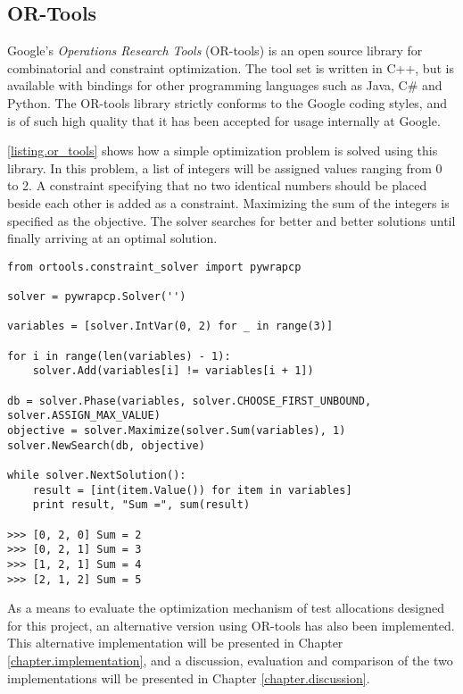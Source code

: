 \subsection{OR-Tools}\label{subsection.ortools}
Google's \emph{Operations Research Tools} (OR-tools) \cite{ortools} is an open source library for combinatorial and constraint optimization. The tool set is written in C++, but is available with bindings for other programming languages such as Java, C\# and Python. The OR-tools library strictly conforms to the Google coding styles, and is of such high quality that it has been accepted for usage internally at Google.

\lstlistingname \space \ref{listing.or_tools} shows how a simple optimization problem is solved using this library. In this problem, a list of integers will be assigned values ranging from 0 to 2. A constraint specifying that no two identical numbers should be placed beside each other is added as a constraint. Maximizing the sum of the integers is specified as the objective. The solver searches for better and better solutions until finally arriving at an optimal solution.

\vspace{4mm}
\begin{lstlisting}[caption=OR-Tool Implementation, label={listing.or_tools}]
from ortools.constraint_solver import pywrapcp

solver = pywrapcp.Solver('')

variables = [solver.IntVar(0, 2) for _ in range(3)]

for i in range(len(variables) - 1):
    solver.Add(variables[i] != variables[i + 1])

db = solver.Phase(variables, solver.CHOOSE_FIRST_UNBOUND, solver.ASSIGN_MAX_VALUE)
objective = solver.Maximize(solver.Sum(variables), 1)
solver.NewSearch(db, objective)

while solver.NextSolution():
    result = [int(item.Value()) for item in variables]
    print result, "Sum =", sum(result)

>>> [0, 2, 0] Sum = 2
>>> [0, 2, 1] Sum = 3
>>> [1, 2, 1] Sum = 4
>>> [2, 1, 2] Sum = 5
\end{lstlisting}

As a means to evaluate the optimization mechanism of test allocations designed for this project, an alternative version using OR-tools has also been implemented. This alternative implementation will be presented in Chapter \ref{chapter.implementation}, and a discussion, evaluation and comparison of the two implementations will be presented in Chapter \ref{chapter.discussion}.